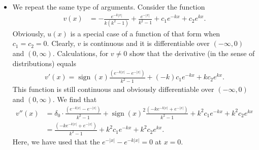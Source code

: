 \documentclass[11pt]{article}
\begin{document}
\begin{solution}
\begin{itemize}
    \item 
    We repeat the same type of arguments.
    Consider the function 
    \begin{align*}
        v(x) 
        &= 
        - \frac{ e^{-k|x|} }{ k (k^2-1) } 
        + 
        \frac{ e^{-|x|} }{ k^2-1 } 
        + 
        c_1 e^{-kx} 
        + 
        c_2 e^{kx}
        .
    \end{align*}
    Obviously, $u(x)$ is a special case of a function of that form when $c_1 = c_2 = 0$. 
    Clearly, $v$ is continuous and it is differentiable over $(-\infty,0)$ and $(0,\infty)$. 
    Calculations, for $v \neq 0$ show that the derivative (in the sense of distributions) equals 
    \begin{align*}
        v'(x)
        =
        \operatorname{sign}(x) \frac{ \left( e^{-k|x|} -  e^{-|x|} \right) }{ k^{2}-1 }
        + 
        (-k) c_1 e^{-kx} 
        + 
          k  c_2 e^{kx}
        .
    \end{align*}
    This function is still continuous and obviously differentiable over $(-\infty,0)$ and $(0,\infty)$. 
    We find that 
    \begin{align*}
        v''(x)
        &=
        \delta_{0} \cdot \frac{ \left( e^{-k|x|} -  e^{-|x|} \right) }{ k^{2}-1 }
        +
        \operatorname{sign}(x)^{2} \frac{ \left( - k e^{-k|x|} + e^{-|x|} \right) }{ k^{2}-1 }
        + 
        k^{2} c_1 e^{-kx} 
        + 
        k^{2} c_2 e^{kx}
        \\&
        =
        \frac{ \left( - k e^{-k|x|} + e^{-|x|} \right) }{ k^{2}-1 }
        + 
        k^{2} c_1 e^{-kx} 
        + 
        k^{2} c_2 e^{kx}
        .
    \end{align*}
    Here, we have used that the $e^{-|x|} - e^{-k|x|} = 0$ at $x=0$. 
    

\end{itemize}
\end{solution}
\end{document}
